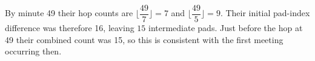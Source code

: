 By minute 49 their hop counts are $\lfloor\dfrac{49}{7}\rfloor=7$ and $\lfloor\dfrac{49}{5}\rfloor=9$. Their initial pad-index difference was therefore 16, leaving $\boxed{15}$ intermediate pads. Just before the hop at 49 their combined count was 15, so this is consistent with the first meeting occurring then.
